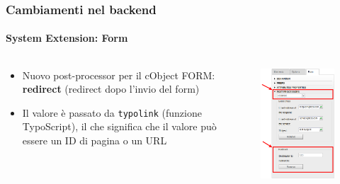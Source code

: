 \begin{frame}[fragile]
	\frametitle{Cambiamenti nel backend}
	\framesubtitle{System Extension: Form}

	\begin{columns}[T]

		\begin{column}{.5\textwidth}
			\begin{itemize}
				\item Nuovo post-processor per il cObject FORM: \textbf{redirect}\newline
					(redirect dopo l'invio del form)
				\item Il valore è passato da \texttt{typolink} (funzione TypoScript),\newline
					il che significa che il valore può essere un ID di pagina o un URL
			\end{itemize}
		\end{column}

		\begin{column}{.5\textwidth}
			\begin{figure}\vspace*{-0.4cm}
				\includegraphics[width=0.65\linewidth]{Images/BackendChanges/FormRedirectPostProcessor.png}
			\end{figure}
		\end{column}

	\end{columns}

\end{frame}

